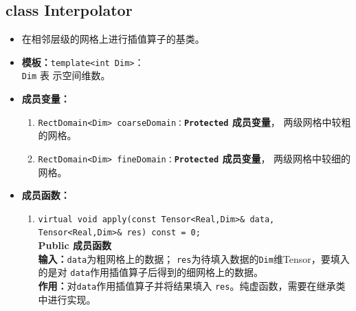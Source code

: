 \documentclass[a4paper,twoside]{ctexart}
\begin{document}
\subsection*{class Interpolator}
\begin{itemize}
    \item 在相邻层级的网格上进行插值算子的基类。
    \item \textbf{模板：}\texttt{template<int Dim>}：\\\texttt{Dim} 表
      示空间维数。
       \item \textbf{成员变量：}
        \begin{enumerate}[(1)]
            \item \texttt{RectDomain<Dim>
                coarseDomain：}\textbf{\texttt{Protected}  成员变量}，
              两级网格中较粗的网格。
              \item \texttt{RectDomain<Dim>
                fineDomain：}\textbf{\texttt{Protected}  成员变量}，
              两级网格中较细的网格。
        \end{enumerate}
    \item \textbf{成员函数：}
            \begin{enumerate}[(1)]
                \item \texttt{virtual void apply(const Tensor<Real,Dim>\& data,
                    Tensor<Real,Dim>\& res) const = 0;}\\
                  \textbf{Public 成员函数}\\
                \textbf{输入：}\texttt{data}为粗网格上的数据；
                \texttt{res}为待填入数据的\texttt{Dim}维Tensor，要填入的是对
                \texttt{data}作用插值算子后得到的细网格上的数据。\\
                \textbf{作用：}对\texttt{data}作用插值算子并将结果填入
                \texttt{res}。纯虚函数，需要在继承类中进行实现。
            \end{enumerate}
          \end{itemize}
\end{document}
